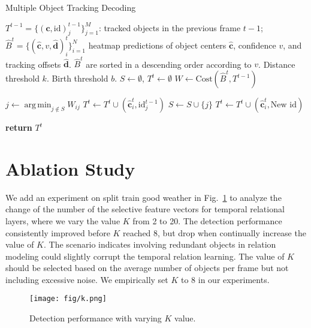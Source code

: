 \documentclass[10pt,twocolumn,letterpaper]{article}
\DeclareMathOperator*{\argmin}{arg\,min} \usepackage[pagebackref,breaklinks,colorlinks]{hyperref}
\begin{document}
\begin{algorithm}[ht]
\caption{Multiple Object Tracking Decoding}\label{alg:track}
\begin{algorithmic}[1]
\Require $T^{t-1} = \{(\textbf{c}, \text{id})_j^{t-1}\}_{j=1}^M$: tracked objects in the previous frame $t-1$; $\hat{B}^t = \{(\hat{\textbf{c}}, v, \hat{\textbf{d}})_i^t\}_{i=1}^N$ heatmap predictions of object centers $\hat{\textbf{c}}$, confidence $v$, and tracking offsets $\hat{\textbf{d}}$. $\hat{B}^t$ are sorted in a descending order according to $v$. Distance threshold $k$. Birth threshold $b$.
\State $S\gets \emptyset$, $T^t \gets \emptyset$
\State $W\gets \text{Cost}(\hat{B}^t, T^{t-1})$ 

    \State $j\gets \argmin_{j\notin S} W_{ij}$
        \State $T^t\gets T^t\cup (\hat{\textbf{c}}_i^t, \text{id}_j^{t-1})$ 
        \State $S\gets S\cup \{j\}$ 
        \State $T^t\gets T^t\cup (\hat{\textbf{c}}_i^t, \text{New id})$ 
    \EndIf
\EndFor

\State \textbf{return} $T^t$
\end{algorithmic}
\end{algorithm}



\section{Ablation Study}

We add an experiment on split train good weather in Fig.~\ref{fig:k} to analyze the change of the number of the selective feature vectors for temporal relational layers, where we vary the value $K$ from 2 to 20. The detection performance consistently improved before $K$ reached 8, but drop when continually increase the value of $K$. The scenario indicates involving redundant objects in relation modeling could slightly corrupt the temporal relation learning. The value of $K$ should be selected based on the average number of objects per frame but not including excessive noise. We empirically set $K$ to 8 in our experiments.

\begin{figure}
    \centering
    \texttt{[image: fig/k.png]}
    \caption{Detection performance with varying $K$ value.}
    \label{fig:k}
\end{figure}
\end{document}
